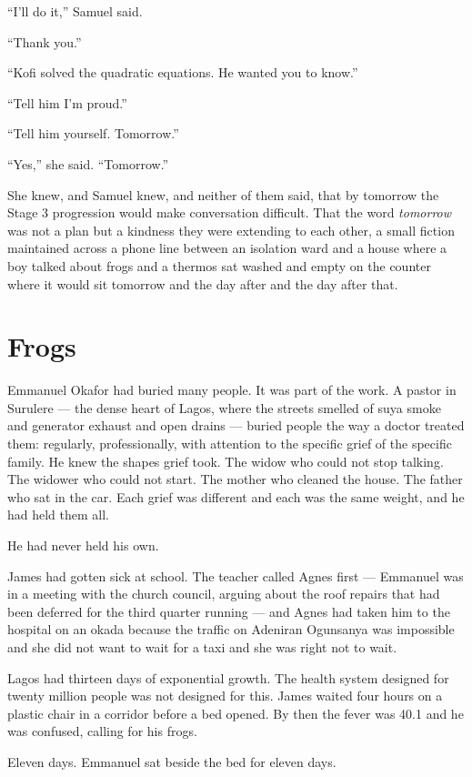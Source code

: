 \documentclass[11pt]{article}
\begin{document}
``I'll do it,'' Samuel said.

``Thank you.''

``Kofi solved the quadratic equations. He wanted you to know.''

``Tell him I'm proud.''

``Tell him yourself. Tomorrow.''

``Yes,'' she said. ``Tomorrow.''

She knew, and Samuel knew, and neither of them said, that by tomorrow the Stage 3 progression would make conversation difficult. That the word \emph{tomorrow} was not a plan but a kindness they were extending to each other, a small fiction maintained across a phone line between an isolation ward and a house where a boy talked about frogs and a thermos sat washed and empty on the counter where it would sit tomorrow and the day after and the day after that.

\section*{Frogs}

Emmanuel Okafor had buried many people. It was part of the work. A pastor in Surulere --- the dense heart of Lagos, where the streets smelled of suya smoke and generator exhaust and open drains --- buried people the way a doctor treated them: regularly, professionally, with attention to the specific grief of the specific family. He knew the shapes grief took. The widow who could not stop talking. The widower who could not start. The mother who cleaned the house. The father who sat in the car. Each grief was different and each was the same weight, and he had held them all.

He had never held his own.

James had gotten sick at school. The teacher called Agnes first --- Emmanuel was in a meeting with the church council, arguing about the roof repairs that had been deferred for the third quarter running --- and Agnes had taken him to the hospital on an okada because the traffic on Adeniran Ogunsanya was impossible and she did not want to wait for a taxi and she was right not to wait.

Lagos had thirteen days of exponential growth. The health system designed for twenty million people was not designed for this. James waited four hours on a plastic chair in a corridor before a bed opened. By then the fever was 40.1 and he was confused, calling for his frogs.

Eleven days. Emmanuel sat beside the bed for eleven days.
\end{document}
